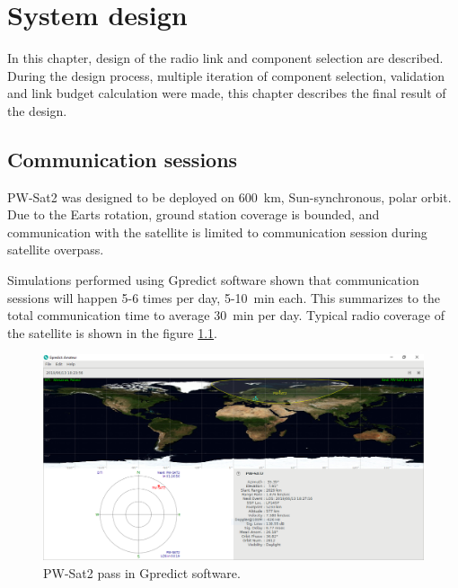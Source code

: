 \part{System design}

In this chapter, design of the radio link and component selection are described. During the design process, multiple iteration of component selection, validation and link budget calculation were made, this chapter describes the final result of the design.

\chapter{Communication sessions}
PW-Sat2 was designed to be deployed on \SI{600}{\kilo\meter}, Sun-synchronous, polar orbit. Due to the Earts rotation, ground station coverage is bounded, and communication with the satellite is limited to communication session during satellite overpass.

Simulations performed using Gpredict software \cite{gpredict_website} shown that communication sessions will happen \si{5}-\si{6} times per day, \si{5}-\SI{10}{\minute} each. This summarizes to the total communication time to average \SI{30}{\minute} per day. Typical radio coverage of the satellite is shown in the figure \ref{gpredict_pass}.

\begin{figure}[H]
    \centering
    \includegraphics[width=0.8\paperwidth]{img/3/gpredict_pass.png}
    \caption{PW-Sat2 pass in Gpredict software.}
    \label{gpredict_pass}
\end{figure}


